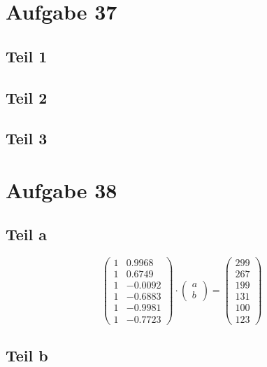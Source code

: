 \documentclass[10pt,a4paper]{article}
\begin{document}
\section{Aufgabe 37}

\subsection{Teil 1}

\subsection{Teil 2}

\subsection{Teil 3}

\section{Aufgabe 38}

\subsection{Teil a}

\begin{equation}
  \begin{pmatrix}
    1 & 0.9968\\
    1 & 0.6749\\
    1 & -0.0092\\
    1 & -0.6883\\
    1 & -0.9981\\
    1 & -0.7723
  \end{pmatrix}
  \cdot
  \begin{pmatrix}
    a\\b
  \end{pmatrix}
  =
  \begin{pmatrix}
    299\\267\\199\\131\\100\\123
  \end{pmatrix}
\end{equation}

\subsection{Teil b}
\end{document}
